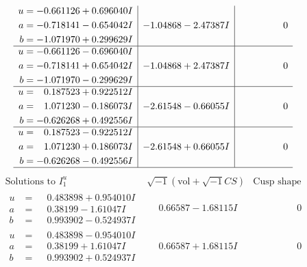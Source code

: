\documentclass[1p]{elsarticle_modified}
\theoremstyle{definition}
\newcommand{\I}{\sqrt{-1}}
\begin{document}
$$\begin{array}{c|c|c}
\begin{aligned}
u &= -0.661126 + 0.696040 I \\
a &= -0.718141 - 0.654042 I \\
b &= -1.071970 + 0.299629 I\end{aligned}
 & -1.04868 - 2.47387 I & \phantom{-0.000000 } 0 \\ \hline\begin{aligned}
u &= -0.661126 - 0.696040 I \\
a &= -0.718141 + 0.654042 I \\
b &= -1.071970 - 0.299629 I\end{aligned}
 & -1.04868 + 2.47387 I & \phantom{-0.000000 } 0 \\ \hline\begin{aligned}
u &= \phantom{-}0.187523 + 0.922512 I \\
a &= \phantom{-}1.071230 - 0.186073 I \\
b &= -0.626268 + 0.492556 I\end{aligned}
 & -2.61548 - 0.66055 I & \phantom{-0.000000 } 0 \\ \hline\begin{aligned}
u &= \phantom{-}0.187523 - 0.922512 I \\
a &= \phantom{-}1.071230 + 0.186073 I \\
b &= -0.626268 - 0.492556 I\end{aligned}
 & -2.61548 + 0.66055 I & \phantom{-0.000000 } 0\\
 \hline 
 \end{array}$$\newpage$$\begin{array}{c|c|c}  
\text{Solutions to }I^u_{1}& \I (\text{vol} + \sqrt{-1}CS) & \text{Cusp shape}\\
 \hline 
\begin{aligned}
u &= \phantom{-}0.483898 + 0.954010 I \\
a &= \phantom{-}0.38199 - 1.61047 I \\
b &= \phantom{-}0.993902 - 0.524937 I\end{aligned}
 & \phantom{-}0.66587 - 1.68115 I & \phantom{-0.000000 } 0 \\ \hline\begin{aligned}
u &= \phantom{-}0.483898 - 0.954010 I \\
a &= \phantom{-}0.38199 + 1.61047 I \\
b &= \phantom{-}0.993902 + 0.524937 I\end{aligned}
 & \phantom{-}0.66587 + 1.68115 I & \phantom{-0.000000 } 0 \\ \hline\begin{aligned}

\end{aligned}
\end{array}$$
\end{document}
